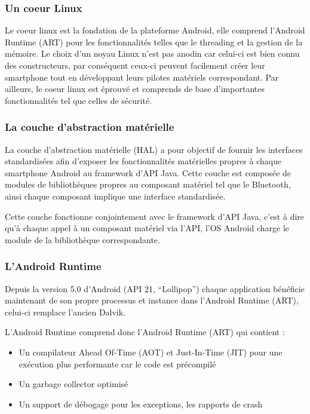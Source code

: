 \documentclass[11]{article}
\begin{document}
\subsubsection{Un coeur Linux}

Le coeur linux est la fondation de la plateforme Android, elle comprend l’Android Runtime (ART) pour les fonctionnalités telles que le threading et la gestion de la mémoire.
Le choix d’un noyau Linux n’est pas anodin car celui-ci est bien connu des constructeurs, par conséquent ceux-ci peuvent facilement créer leur smartphone tout en développant leurs pilotes matériels correspondant. Par ailleurs, le coeur linux est éprouvé et comprends de base d’importantes fonctionnalités tel que celles de sécurité.


\subsubsection{La couche d’abstraction matérielle}

La couche d'abstraction matérielle (HAL)  a pour objectif de fournir les interfaces standardisées afin d’exposer les fonctionnalités matérielles propres à chaque smartphone Android au framework d’API Java.
Cette couche est composée de modules de bibliothèques propres au composant matériel tel que le Bluetooth, ainsi chaque composant implique une interface standardisée.
 
 \vspace{0.5cm}
 
Cette couche fonctionne conjointement avec le framework d’API Java, c’est à dire qu'à chaque appel à un composant matériel via l’API, l’OS Android charge le module de la bibliothèque correspondante.


\subsubsection{L’Android Runtime}

Depuis la version 5.0 d’Android (API 21, “Lollipop”) chaque application bénéficie maintenant de son propre processus et instance dans l’Android Runtime (ART), celui-ci remplace l’ancien Dalvik.
 
L’Android Runtime comprend donc l’Android Runtime (ART) qui contient :

\begin{itemize}
\item Un compilateur Ahead Of-Time (AOT) et Just-In-Time (JIT) pour une exécution plus performante car le code est précompilé
\item Un garbage collector optimisé
\item Un support de débogage pour les exceptions, les rapports de crash
\end{itemize}
\end{document}
